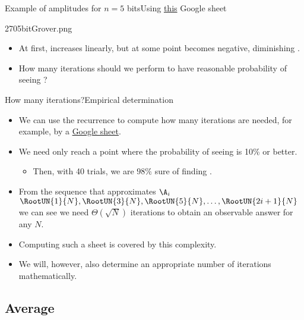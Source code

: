 \begin{Grover}
\begin{frame}{Example of amplitudes for $n=5$ bits}{Using \href{https://docs.google.com/spreadsheets/d/1JCp9PKLTQ7q9jdvRwj-gXxL9jYvu1O-1wA2OnnEBB3s/edit?usp=sharing}{this} Google sheet}

\Vskip{-4em}\begin{center}
\begin{Pixture}[width=0.5\textwidth]{270}{5bitGrover.png}
\end{Pixture}
\end{center}
\begin{itemize}
    \item At first, \A{} increases linearly, but at some point \B{} becomes negative, diminishing \A{}.
    \item How many iterations should we perform to have reasonable probability of seeing \W?
\end{itemize}
    
\end{frame}


\begin{frame}{How many iterations?}{Empirical determination}

\begin{itemize}
    \item We can use the recurrence to compute how many iterations are needed, for example, by a \href{https://docs.google.com/spreadsheets/d/1JCp9PKLTQ7q9jdvRwj-gXxL9jYvu1O-1wA2OnnEBB3s/edit?usp=sharing}{Google sheet}.
    \item We need only reach a point where the probability of seeing \W{} is 10\% or better.
   \begin{itemize}\item Then, with 40 trials, we are $98\%$ sure of finding \W.\end{itemize}
     \item From the sequence that approximates $\A_{i}$
    \(\RootUN{1}{N}, \RootUN{3}{N}, \RootUN{5}{N},\ldots, \RootUN{2i+1}{N}\)
    we can see we need $\Theta(\sqrt{N})$ iterations to obtain an observable answer for any $N$.
       \item Computing such a sheet is covered by this complexity.
    \item We will, however, also determine an appropriate number of iterations mathematically.
\end{itemize}
    
\end{frame}

\subsection*{Average}


\end{Grover}
